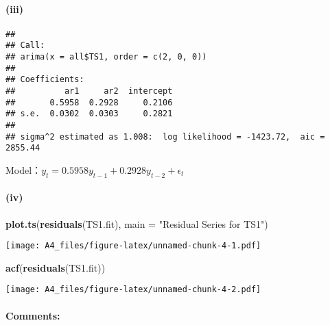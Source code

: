 \documentclass[]{article}
\newenvironment{Shaded}{\begin{snugshade}}{\end{snugshade}}
\newcommand{\DataTypeTok}[1]{\textcolor[rgb]{0.13,0.29,0.53}{#1}}
\newcommand{\DecValTok}[1]{\textcolor[rgb]{0.00,0.00,0.81}{#1}}
\newcommand{\KeywordTok}[1]{\textcolor[rgb]{0.13,0.29,0.53}{\textbf{#1}}}
\newcommand{\NormalTok}[1]{#1}
\newcommand{\OperatorTok}[1]{\textcolor[rgb]{0.81,0.36,0.00}{\textbf{#1}}}
\newcommand{\StringTok}[1]{\textcolor[rgb]{0.31,0.60,0.02}{#1}}
\let\oldparagraph\paragraph
\renewcommand{\paragraph}[1]{\oldparagraph{#1}\mbox{}}
\begin{document}
\hypertarget{iii}{%
\paragraph{(iii)}\label{iii}}

\begin{Shaded}
\end{Shaded}

\begin{verbatim}
## 
## Call:
## arima(x = all$TS1, order = c(2, 0, 0))
## 
## Coefficients:
##          ar1     ar2  intercept
##       0.5958  0.2928     0.2106
## s.e.  0.0302  0.0303     0.2821
## 
## sigma^2 estimated as 1.008:  log likelihood = -1423.72,  aic = 2855.44
\end{verbatim}

Model：\(y_t = 0.5958y_{t-1} + 0.2928y_{t-2} + \epsilon_t\)

\hypertarget{iv}{%
\paragraph{(iv)}\label{iv}}

\begin{Shaded}
\begin{Highlighting}[]
\KeywordTok{plot.ts}\NormalTok{(}\KeywordTok{residuals}\NormalTok{(TS1.fit), }\DataTypeTok{main =} \StringTok{"Residual Series for TS1"}\NormalTok{)}
\end{Highlighting}
\end{Shaded}

\texttt{[image: A4\_files/figure-latex/unnamed-chunk-4-1.pdf]}

\begin{Shaded}
\begin{Highlighting}[]
\KeywordTok{acf}\NormalTok{(}\KeywordTok{residuals}\NormalTok{(TS1.fit))}
\end{Highlighting}
\end{Shaded}

\texttt{[image: A4\_files/figure-latex/unnamed-chunk-4-2.pdf]}

\hypertarget{comments}{%
\paragraph{Comments:}\label{comments}}
\end{document}
